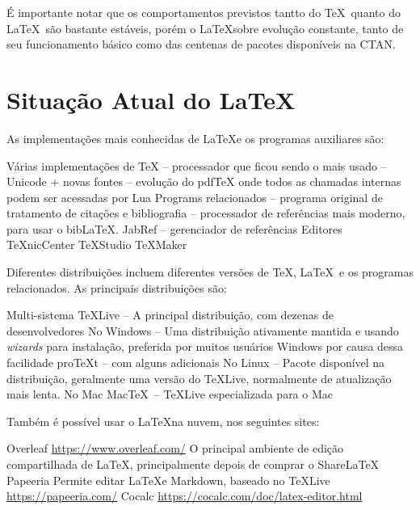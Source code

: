 É importante notar que os comportamentos previstos tantto do \TeX\  quanto do \LaTeX\  são bastante estáveis, porém o \LaTeX  sobre evolução constante, tanto de seu funcionamento básico como das centenas de pacotes disponíveis na CTAN.

\section{Situação Atual do \LaTeX}

As implementações mais conhecidas de \LaTeX e os programas auxiliares são:
\begin{outline}
\1 Várias implementações de \TeX
    \2  -- processador que ficou sendo o mais usado
    \2   -- Unicode + novas fontes
    \2  -- evolução do pdfTeX onde todos as chamadas internas podem ser acessadas por Lua 
\1 Programs relacionados
    \2  -- programa original de tratamento de citações e bibliografia
    \2  -- processador de referências mais moderno, para usar o bib\LaTeX.
    \2 JabRef -- gerenciador de referências
\1 Editores
    \2 \TeX nicCenter
    \2 \TeX Studio 
    \2 \TeX Maker 
\end{outline}
    
    
Diferentes distribuições incluem diferentes versões de \TeX, \LaTeX\  
e os programas relacionados. As principais distribuições são:

\begin{outline}
    \1 Multi-sistema
    \2 \TeX Live --
    A principal distribuição, com dezenas de desenvolvedores
    \1 No Windows
    \2  --
    Uma distribuição ativamente mantida e usando \textit{wizards} para instalação, 
    preferida por muitos usuários Windows por causa dessa facilidade
    \2 pro\TeX t  -- \hologo{MiKTeX} com alguns adicionais
    \1 No Linux
--    \2 Pacote disponível na distribuição, geralmente uma versão do \TeX Live, normalmente de atualização mais lenta.
    \1 No Mac
    \2 Mac\TeX\  -- \TeX Live  especializada para o Mac
\end{outline}


Também é possível usar o \LaTeX  na nuvem, nos seguintes sites:
\begin{outline}
    \1 Overleaf
    \2 \url{https://www.overleaf.com/}
    \2 O principal ambiente de edição compartilhada de \LaTeX, principalmente
    depois de comprar o ShareLaTeX
    \1 Papeeria
    \2 Permite editar \LaTeX e Markdown, baseado no \TeX Live
    \2 \url{https://papeeria.com/}
    \1 Cocalc
    \2 \url{https://cocalc.com/doc/latex-editor.html}
\end{outline}
    
